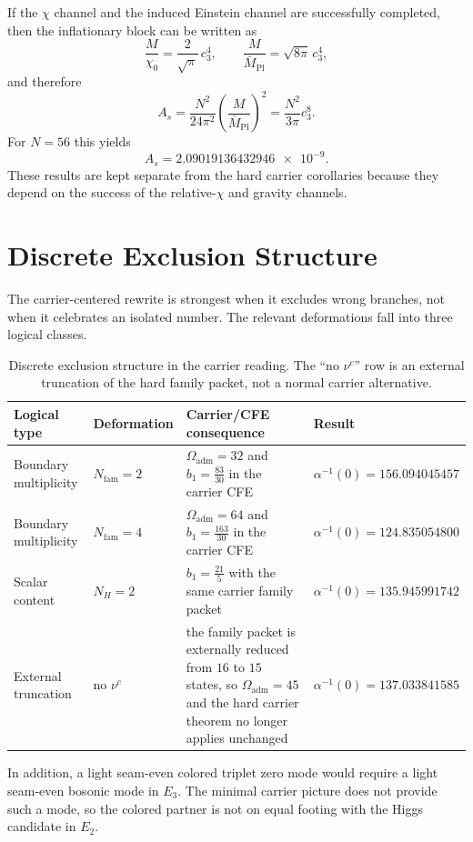 \documentclass[11pt,a4paper]{article}
\theoremstyle{definition}
\theoremstyle{remark}
\newcommand{\Mpl}{\bar M_{\mathrm{Pl}}}
\newcommand{\cthree}{c_3}
\newcommand{\bone}{b_1}
\newcommand{\Oadm}{\Omega_{\mathrm{adm}}}
\begin{document}
If the $\chi$ channel and the induced Einstein channel are successfully completed, then the inflationary block can be written as
\[
\frac{M}{\chi_0}=\frac{2}{\sqrt{\pi}}\,\cthree^4,
\qquad
\frac{M}{\Mpl}=\sqrt{8\pi}\,\cthree^4,
\]
and therefore
\[
A_s=\frac{N^2}{24\pi^2}\left(\frac{M}{\Mpl}\right)^2
= \frac{N^2}{3\pi}\cthree^8.
\]
For $N=56$ this yields
\[
A_s=\num{2.09019136432946e-9}.
\]
These results are kept separate from the hard carrier corollaries because they depend on the success of the relative-$\chi$ and gravity channels.

\section{Discrete Exclusion Structure}

The carrier-centered rewrite is strongest when it excludes wrong branches, not when it celebrates an isolated number. The relevant deformations fall into three logical classes.

\begin{table}[H]
\centering
\small
\begin{tabularx}{\linewidth}{@{}l l X l@{}}
\toprule
Logical type & Deformation & Carrier/CFE consequence & Result \\
\midrule
Boundary multiplicity & $N_{\mathrm{fam}}=2$ & $\Oadm=32$ and $\bone=\frac{83}{30}$ in the carrier CFE & $\alpha^{-1}(0)=\num{156.094045457}$ \\
Boundary multiplicity & $N_{\mathrm{fam}}=4$ & $\Oadm=64$ and $\bone=\frac{163}{30}$ in the carrier CFE & $\alpha^{-1}(0)=\num{124.835054800}$ \\
Scalar content & $N_H=2$ & $\bone=\frac{21}{5}$ with the same carrier family packet & $\alpha^{-1}(0)=\num{135.945991742}$ \\
External truncation & no $\nu^c$ & the family packet is externally reduced from $16$ to $15$ states, so $\Oadm=45$ and the hard carrier theorem no longer applies unchanged & $\alpha^{-1}(0)=\num{137.033841585}$ \\
\bottomrule
\end{tabularx}
\caption{Discrete exclusion structure in the carrier reading. The ``no $\nu^c$'' row is an external truncation of the hard family packet, not a normal carrier alternative.}
\end{table}

In addition, a light seam-even colored triplet zero mode would require a light seam-even bosonic mode in $E_3$. The minimal carrier picture does not provide such a mode, so the colored partner is not on equal footing with the Higgs candidate in $E_2$.
\end{document}
